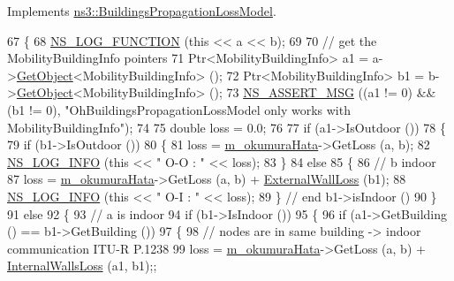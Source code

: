 Implements \hyperlink{classns3_1_1BuildingsPropagationLossModel_a6d3a26e3118fdfd83253387f4360dc55}{ns3\+::\+Buildings\+Propagation\+Loss\+Model}.


\begin{DoxyCode}
67 \{
68   \hyperlink{log-macros-disabled_8h_a90b90d5bad1f39cb1b64923ea94c0761}{NS\_LOG\_FUNCTION} (\textcolor{keyword}{this} << a << b);
69 
70   \textcolor{comment}{// get the MobilityBuildingInfo pointers}
71   Ptr<MobilityBuildingInfo> a1 = a->\hyperlink{classns3_1_1Object_a13e18c00017096c8381eb651d5bd0783}{GetObject}<MobilityBuildingInfo> ();
72   Ptr<MobilityBuildingInfo> b1 = b->\hyperlink{classns3_1_1Object_a13e18c00017096c8381eb651d5bd0783}{GetObject}<MobilityBuildingInfo> ();
73   \hyperlink{assert_8h_aff5ece9066c74e681e74999856f08539}{NS\_ASSERT\_MSG} ((a1 != 0) && (b1 != 0), \textcolor{stringliteral}{"OhBuildingsPropagationLossModel only works with
       MobilityBuildingInfo"});
74 
75   \textcolor{keywordtype}{double} loss = 0.0;
76 
77   \textcolor{keywordflow}{if} (a1->IsOutdoor ())
78     \{
79       \textcolor{keywordflow}{if} (b1->IsOutdoor ())
80         \{
81           loss = \hyperlink{classns3_1_1OhBuildingsPropagationLossModel_a1931526744ccd71a92eb64b321129c1b}{m\_okumuraHata}->GetLoss (a, b);
82           \hyperlink{group__logging_gafbd73ee2cf9f26b319f49086d8e860fb}{NS\_LOG\_INFO} (\textcolor{keyword}{this} << \textcolor{stringliteral}{" O-O : "} << loss);
83         \}
84       \textcolor{keywordflow}{else}
85         \{
86           \textcolor{comment}{// b indoor}
87           loss = \hyperlink{classns3_1_1OhBuildingsPropagationLossModel_a1931526744ccd71a92eb64b321129c1b}{m\_okumuraHata}->GetLoss (a, b) + \hyperlink{classns3_1_1BuildingsPropagationLossModel_a67bc86adffb07914535f5f6f435fac47}{ExternalWallLoss} (b1);
88           \hyperlink{group__logging_gafbd73ee2cf9f26b319f49086d8e860fb}{NS\_LOG\_INFO} (\textcolor{keyword}{this} << \textcolor{stringliteral}{" O-I : "} << loss);
89         \} \textcolor{comment}{// end b1->isIndoor ()}
90     \}
91   \textcolor{keywordflow}{else}
92     \{
93       \textcolor{comment}{// a is indoor}
94       \textcolor{keywordflow}{if} (b1->IsIndoor ())
95         \{
96           \textcolor{keywordflow}{if} (a1->GetBuilding () == b1->GetBuilding ())
97             \{
98               \textcolor{comment}{// nodes are in same building -> indoor communication ITU-R P.1238}
99               loss = \hyperlink{classns3_1_1OhBuildingsPropagationLossModel_a1931526744ccd71a92eb64b321129c1b}{m\_okumuraHata}->GetLoss (a, b) + 
      \hyperlink{classns3_1_1BuildingsPropagationLossModel_a5d8bdc1afcb1061352e0e24a0b3db396}{InternalWallsLoss} (a1, b1);;

\end{DoxyCode}
